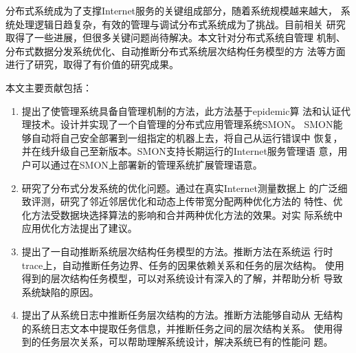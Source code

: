 \begin{cabstract}


  分布式系统成为了支撑Internet服务的关键组成部分，随着系统规模越来越大，
  系统处理逻辑日趋复杂，有效的管理与调试分布式系统成为了挑战。目前相关
  研究取得了一些进展，但很多关键问题尚待解决。本文针对分布式系统自管理
  机制、分布式数据分发系统优化、自动推断分布式系统层次结构任务模型的方
  法等方面进行了研究，取得了有价值的研究成果。

  本文主要贡献包括：

  \begin{enumerate}

    \item 提出了使管理系统具备自管理机制的方法，此方法基于epidemic算
    法和认证代理技术。设计并实现了一个自管理的分布式应用管理系统SMON。
    SMON能够自动将自己安全部署到一组指定的机器上去，将自己从运行错误中
    恢复，并在线升级自己至新版本。SMON支持长期运行的Internet服务管理语
    意，用户可以通过在SMON上部署新的管理系统扩展管理语意。

    \item 研究了分布式分发系统的优化问题。通过在真实Internet测量数据上
    的广泛细致评测，研究了邻近邻居优化和动态上传带宽分配两种优化方法的
    特性、优化方法受数据块选择算法的影响和合并两种优化方法的效果。对实
    际系统中应用优化方法提出了建议。

    \item 提出了一自动推断系统层次结构任务模型的方法。推断方法在系统运
    行时trace上，自动推断任务边界、任务的因果依赖关系和任务的层次结构。
    使用得到的层次结构任务模型，可以对系统设计有深入的了解，并帮助分析
    导致系统缺陷的原因。

    \item 提出了从系统日志中推断任务层次结构的方法。推断方法能够自动从
    无结构的系统日志文本中提取任务信息，并推断任务之间的层次结构关系。
    使用得到的任务层次关系，可以帮助理解系统设计，解决系统已有的性能问
    题。

  \end{enumerate}

\end{cabstract}



